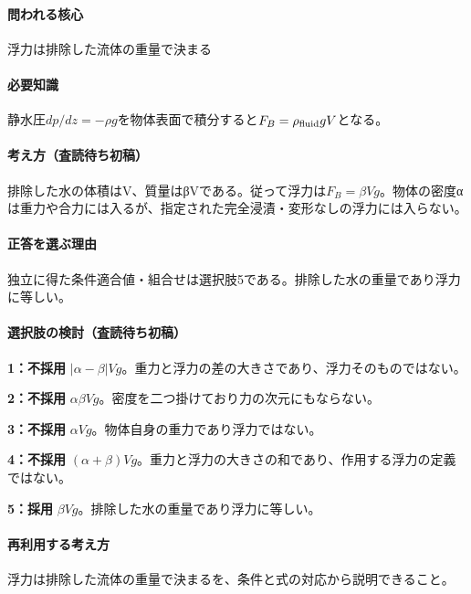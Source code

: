 \paragraph{問われる核心} 浮力は排除した流体の重量で決まる

\paragraph{必要知識} 静水圧\(dp/dz=-\rho g\)を物体表面で積分すると\(F_B=\rho_{\rm fluid}gV\)となる。

\paragraph{考え方（査読待ち初稿）} 排除した水の体積はV、質量はβVである。従って浮力は\(F_B=\beta Vg\)。物体の密度αは重力や合力には入るが、指定された完全浸漬・変形なしの浮力には入らない。

\paragraph{正答を選ぶ理由} 独立に得た条件適合値・組合せは選択肢5である。排除した水の重量であり浮力に等しい。

\paragraph{選択肢の検討（査読待ち初稿）}\mbox{}\par

\noindent\textbf{1：不採用} \(|\alpha-\beta|Vg\)。重力と浮力の差の大きさであり、浮力そのものではない。\par

\noindent\textbf{2：不採用} \(\alpha\beta Vg\)。密度を二つ掛けており力の次元にもならない。\par

\noindent\textbf{3：不採用} \(\alpha Vg\)。物体自身の重力であり浮力ではない。\par

\noindent\textbf{4：不採用} \((\alpha+\beta)Vg\)。重力と浮力の大きさの和であり、作用する浮力の定義ではない。\par

\noindent\textbf{5：採用} \(\beta Vg\)。排除した水の重量であり浮力に等しい。\par

\paragraph{再利用する考え方} 浮力は排除した流体の重量で決まるを、条件と式の対応から説明できること。

